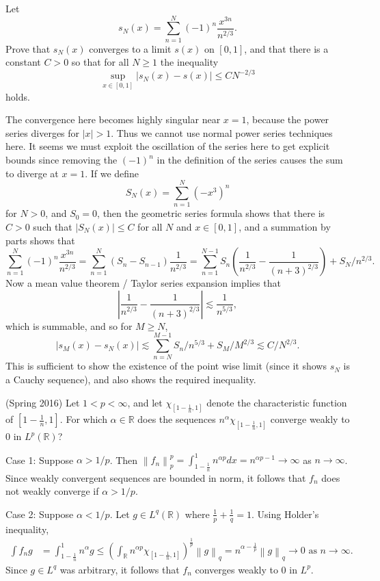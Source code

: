\documentclass[answers]{exam}
\theoremstyle{problemstyle}
\newcommand{\norm}[1]{\left\lVert#1\right\rVert} %
\newcommand{\1}[1]{\textbf{1}_{\left[#1\right]}} %
\def\R{\mathbb{R}} %
\begin{document}
\begin{questions}
\question Let
%
\[ s_N(x) = \sum_{n = 1}^N (-1)^n \frac{x^{3n}}{n^{2/3}}. \]
%
Prove that $s_N(x)$ converges to a limit $s(x)$ on $[0,1]$, and that there is a constant $C > 0$ so that for all $N \geq 1$ the inequality
%
\[ \sup_{x \in [0,1]} |s_N(x) - s(x)|\leq C N^{-2/3} \]
%
holds.
\begin{solution}
    The convergence here becomes highly singular near $x = 1$, because the power series diverges for $|x| > 1$. Thus we cannot use normal power series techniques here. It seems we must exploit the oscillation of the series here to get explicit bounds since removing the $(-1)^n$ in the definition of the series causes the sum to diverge at $x = 1$. If we define
    \[ S_N(x) = \sum_{n = 1}^N (-x^3)^n \]
    for $N > 0$, and $S_0 = 0$, then the geometric series formula shows that there is $C > 0$ such that $|S_N(x)| \leq C$ for all $N$ and $x \in [0,1]$, and a summation by parts shows that
    \[ \sum_{n = 1}^N (-1)^n \frac{x^{3n}}{n^{2/3}} = \sum_{n = 1}^N (S_n - S_{n-1}) \frac{1}{n^{2/3}} = \sum_{n = 1}^{N-1} S_n \left( \frac{1}{n^{2/3}} - \frac{1}{(n+3)^{2/3}} \right) + S_N / n^{2/3}. \]
    Now a mean value theorem / Taylor series expansion implies that
    \[ \left| \frac{1}{n^{2/3}} - \frac{1}{(n+3)^{2/3}} \right| \lesssim \frac{1}{n^{5/3}}, \]
    which is summable, and so for $M \geq N$,
    \[ |s_M(x) - s_N(x)| \lesssim \sum_{n = N}^{M-1} S_n / n^{5/3} + S_M / M^{2/3} \lesssim C/N^{2/3}. \]
    This is sufficient to show the existence of the point wise limit (since it shows $s_N$ is a Cauchy sequence), and also shows the required inequality.
\end{solution}


\item (Spring 2016) Let $1<p<\infty$, and let $\chi_{[1-\frac{1}{n},1]}$ denote the characteristic function of $[1-\frac{1}{n},1]$. For which $\alpha\in \R$ does the sequences $n^{\alpha}\chi_{[1-\frac{1}{n},1]}$ converge weakly to $0$ in $L^{p}(\R)$?

\begin{solution}
  Case 1: Suppose $\alpha> 1/p$. Then $\norm{f_{n}}_{p}^{p} = \int_{1-\frac{1}{n}}^{1}n^{\alpha p}dx = n^{\alpha p - 1}\to \infty$ as $n\to\infty$. Since weakly convergent sequences are bounded in norm, it follows that $f_{n}$ does not weakly converge if $\alpha>1/p$.

  Case 2: Suppose $\alpha<1/p$. Let $g\in L^{q}(\R)$ where $\frac{1}{p}+\frac{1}{q}=1$. Using Holder's inequality,
  \begin{align*}
    \int f_{n}g &= \int_{1-\frac{1}{n}}^{1}n^{\alpha} g \leq \left( \int_{\R}n^{\alpha p}\chi_{[1-\frac{1}{n},1]} \right)^{\frac{1}{p}} \norm{g}_{q} = n^{\alpha-\frac{1}{p}}\norm{g}_{q}\to 0 \text{ as }n\to\infty.
  \end{align*}
  Since $g\in L^{q}$ was arbitrary, it follows that $f_{n}$ converges weakly to $0$ in $L^{p}$.


\end{solution}
\end{questions}
\end{document}
